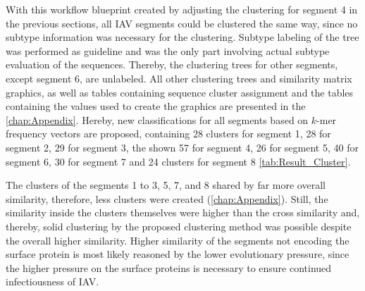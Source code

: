 With this workflow blueprint created by adjusting the clustering for segment 4 in the previous sections, all \gls{IAV} segments could be clustered the same way, since no subtype information was necessary for the clustering. Subtype labeling of the tree was performed as guideline and was the only part involving actual subtype evaluation of the sequences. Thereby, the clustering trees for other segments, except segment 6, are unlabeled. All other clustering trees and similarity matrix graphics, as well as tables containing sequence cluster assignment and the tables containing the values used to create the graphics are presented in the \autoref{chap:Appendix}. Hereby, new classifications for all segments based on $k$-mer frequency vectors are proposed, containing 28 clusters for segment 1, 28 for segment 2, 29 for segment 3, the shown 57 for segment 4, 26 for segment 5, 40 for segment 6, 30 for segment 7 and 24 clusters for segment 8 \autoref{tab:Result_Cluster}. 

\vspace{1em}

The clusters of the segments 1 to 3, 5, 7, and 8 shared by far more overall similarity, therefore, less clusters were created (\autoref{chap:Appendix}). Still, the similarity inside the clusters themselves were higher than the cross similarity and, thereby, solid clustering by the proposed clustering method was possible despite the overall higher similarity. Higher similarity of the segments not encoding the surface protein is most likely reasoned by the lower evolutionary pressure, since the higher pressure on the surface proteins is necessary to ensure continued infectiousness of \gls{IAV}. 